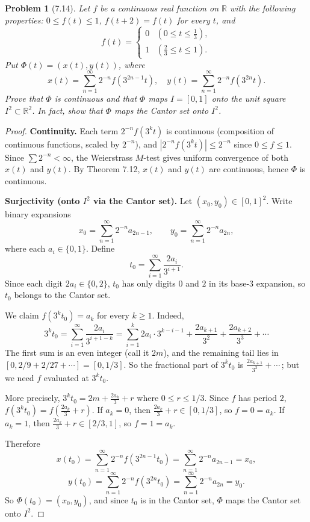 \documentclass[12 pt]{article}
\newtheorem{prob}{Problem}
\begin{document}
\begin{prob}[7.14]
Let $f$ be a continuous real function on $\mathbb{R}$ with the following properties: $0 \leq f(t) \leq 1$, $f(t+2)=f(t)$ for every $t$, and
$$
f(t)= \begin{cases}0 & \left(0 \leq t \leq \tfrac{1}{3}\right), \\ 1 & \left(\tfrac{2}{3} \leq t \leq 1\right).\end{cases}
$$
Put $\Phi(t)=(x(t), y(t))$, where
$$
x(t)=\sum_{n=1}^{\infty} 2^{-n} f(3^{2 n-1} t), \quad y(t)=\sum_{n=1}^{\infty} 2^{-n} f(3^{2 n} t).
$$
Prove that $\Phi$ is continuous and that $\Phi$ maps $I=[0,1]$ onto the unit square $I^{2} \subset \mathbb{R}^{2}$. In fact, show that $\Phi$ maps the Cantor set onto $I^{2}$.
\end{prob}
\begin{proof}
\textbf{Continuity.} Each term $2^{-n} f(3^k t)$ is continuous (composition of continuous functions, scaled by $2^{-n}$), and $|2^{-n} f(3^k t)| \leq 2^{-n}$ since $0 \leq f \leq 1$. Since $\sum 2^{-n} < \infty$, the Weierstrass $M$-test gives uniform convergence of both $x(t)$ and $y(t)$. By Theorem 7.12, $x(t)$ and $y(t)$ are continuous, hence $\Phi$ is continuous.

\textbf{Surjectivity (onto $I^2$ via the Cantor set).} Let $(x_0, y_0) \in [0,1]^2$. Write binary expansions
$$
x_0 = \sum_{n=1}^{\infty} 2^{-n} a_{2n-1}, \qquad y_0 = \sum_{n=1}^{\infty} 2^{-n} a_{2n},
$$
where each $a_i \in \{0, 1\}$. Define
$$
t_0 = \sum_{i=1}^{\infty} \frac{2a_i}{3^{i+1}}.
$$
Since each digit $2a_i \in \{0, 2\}$, $t_0$ has only digits $0$ and $2$ in its base-3 expansion, so $t_0$ belongs to the Cantor set.

We claim $f(3^k t_0) = a_k$ for every $k \geq 1$. Indeed,
$$
3^k t_0 = \sum_{i=1}^{\infty} \frac{2a_i}{3^{i+1-k}} = \sum_{i=1}^{k} 2a_i \cdot 3^{k-i-1} + \frac{2a_{k+1}}{3^2} + \frac{2a_{k+2}}{3^3} + \cdots
$$
The first sum is an even integer (call it $2m$), and the remaining tail lies in $[0, 2/9 + 2/27 + \cdots] = [0, 1/3]$. So the fractional part of $3^k t_0$ is $\frac{2a_{k+1}}{3^2} + \cdots$\,; but we need $f$ evaluated at $3^k t_0$.

More precisely, $3^k t_0 = 2m + \frac{2a_k}{3} + r$ where $0 \leq r \leq 1/3$. Since $f$ has period $2$, $f(3^k t_0) = f(\frac{2a_k}{3} + r)$. If $a_k = 0$, then $\frac{2a_k}{3} + r \in [0, 1/3]$, so $f = 0 = a_k$. If $a_k = 1$, then $\frac{2a_k}{3} + r \in [2/3, 1]$, so $f = 1 = a_k$.

Therefore
$$
x(t_0) = \sum_{n=1}^{\infty} 2^{-n} f(3^{2n-1} t_0) = \sum_{n=1}^{\infty} 2^{-n} a_{2n-1} = x_0,
$$
$$
y(t_0) = \sum_{n=1}^{\infty} 2^{-n} f(3^{2n} t_0) = \sum_{n=1}^{\infty} 2^{-n} a_{2n} = y_0.
$$
So $\Phi(t_0) = (x_0, y_0)$, and since $t_0$ is in the Cantor set, $\Phi$ maps the Cantor set onto $I^2$.
\end{proof}
\end{document}
